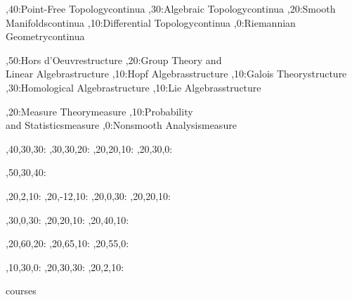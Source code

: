 \documentclass{article}
\begin{document}
	
	\begin{chart}%
		\begin{scope}[every rectangle node/.style={
				sharp corners,
				line width=0.6pt,
				fill=gray!15
			}]
			,40:{}{Point-Free Topology}{continua}
			,30:{}{Algebraic Topology}{continua}
			,20:{}{Smooth Manifolds}{continua}
			,10:{}{Differential Topology}{continua}		
			,0:{}{Riemannian Geometry}{continua}

			,50:{}{Hors d'Oeuvre}{structure}
			,20:{}{Group Theory and\\Linear Algebra}{structure}
			,10:{}{Hopf Algebras}{structure}		
			,10:{}{Galois Theory}{structure}
			,30:{}{Homological Algebra}{structure}
			,10:{}{Lie Algebras}{structure}
			
			,20:{}{Measure Theory}{measure}
			,10:{}{Probability\\and Statistics}{measure}
			,0:{}{Nonsmooth Analysis}{measure}
		\end{scope}
		
		,40,30,30:
		,30,30,20:
		,20,20,10:
		,20,30,0:
		
		,50,30,40:

		,20,2,10:
		,20,-12,10:
		,20,0,30:
		,20,20,10:
		
		,30,0,30:
		,20,20,10:
		,20,40,10:
		
		,20,60,20:
		,20,65,10:
		,20,55,0:
		
		,10,30,0:
		,20,30,30:
		,20,2,10:
		
		\begin{pgfonlayer}{courses}
		\end{pgfonlayer}
	\end{chart}
	
\end{document}
